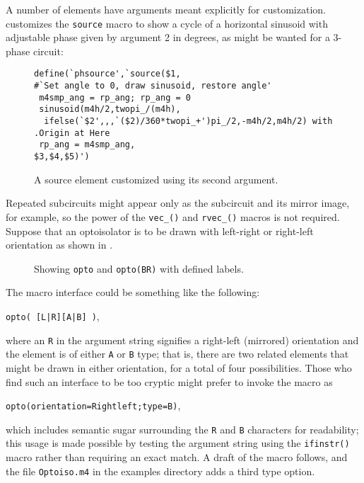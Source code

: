A number of elements have arguments meant explicitly for customization.
 customizes the {\tt source} macro to show a cycle of a horizontal sinusoid with adjustable phase given by argument 2 in degrees,
as might be wanted for a 3-phase circuit:
\begin{figure}[H]
\hfill
 \vspace*{-0.5in}
\begin{verbatim}
define(`phsource',`source($1,
#`Set angle to 0, draw sinusoid, restore angle'
 m4smp_ang = rp_ang; rp_ang = 0
 sinusoid(m4h/2,twopi_/(m4h),
  ifelse(`$2',,,`($2)/360*twopi_+')pi_/2,-m4h/2,m4h/2) with .Origin at Here
 rp_ang = m4smp_ang,
$3,$4,$5)')
\end{verbatim}
\vspace*{-\baselineskip}
   \caption{A source element customized using its second argument.}
   \label{Sinus}
   \end{figure}

\pagebreak
{}
Repeated subcircuits might appear only
as the subcircuit and its mirror image, for example, so the
power of the \verb|vec_()| and \verb|rvec_()| macros is not required.
Suppose that an optoisolator is to be drawn with left-right or right-left
orientation as shown in .
\begin{figure}[H]
   
   \caption{Showing {\tt opto} and {\tt opto(BR)} with defined labels.}
   \label{Opto}
   \end{figure}

The macro interface could be something like the following:
\par
{\tt opto( [L|R][A|B] )},

\noindent where an {\tt R} in the argument string signifies a right-left
(mirrored) orientation and the element is of either {\tt A} or {\tt B} type;
that is, there are two related elements that might be drawn in either
orientation, for a total of four possibilities.
Those who find such an interface to be too cryptic might prefer to
invoke the macro as
\par
{\tt opto(orientation=Rightleft;type=B)},

\noindent
which includes semantic sugar surrounding the {\tt R} and {\tt B} characters
for readability; this usage is made possible by testing the argument string
using the {\tt ifinstr()} macro rather than requiring an exact match.
A draft of the macro follows, and the file {\tt Optoiso.m4} in the examples
directory adds a third type option.

